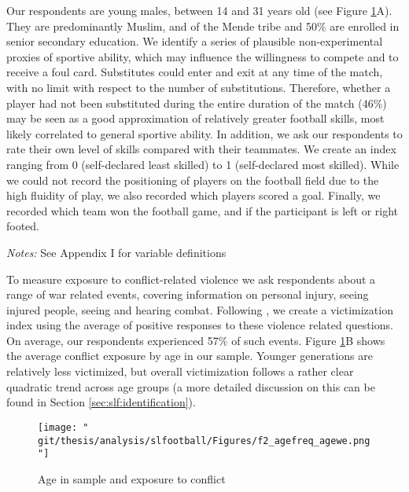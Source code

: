 Our respondents are young males, between 14 and 31 years old (see Figure \ref{fig:slf:ageconflict}A). They are predominantly Muslim, and of the Mende tribe and 50\% are enrolled in senior secondary education. We identify a series of plausible non-experimental proxies of sportive ability, which may influence the willingness to compete and to receive a foul card. Substitutes could enter and exit at any time of the match, with no limit with respect to the number of substitutions. Therefore, whether a player had not been substituted during the entire duration of the match (46\%) may be seen as a good approximation of relatively greater football skills, most likely correlated to general sportive ability. In addition, we ask our respondents to rate their own level of skills compared with their teammates. We create an index ranging from 0 (self-declared least skilled) to 1 (self-declared most skilled). While we could not record the positioning of players on the football field due to the high fluidity of play, we also recorded which players scored a goal. Finally, we recorded which team won the football game,  and if the participant is left or right footed. 

\begin{threeparttable}[htb]
	\caption{Descriptive Statistics}
	\label{tab:slf:summstats}
	\centering
	
	\begin{tablenotes}
		\item \textit{Notes:} See Appendix I for variable definitions
	\end{tablenotes}
\end{threeparttable}

To measure exposure to conflict-related violence we ask respondents about a range of war related events, covering information on personal injury, seeing injured people, seeing and hearing combat.  Following \cite{Bellows2009b}, we create a victimization index using the average of positive responses to these violence related questions. On average, our respondents experienced 57\% of such events.  Figure \ref{fig:slf:ageconflict}B shows the average conflict exposure by age in our sample. Younger generations are relatively less victimized, but overall victimization follows a rather clear quadratic trend across age groups (a more detailed discussion on this can be found in Section \ref{sec:slf:identification}).

\begin{figure}[htb]
  \texttt{[image: "\\git/thesis/analysis/slfootball/Figures/f2\_agefreq\_agewe.png"]}
  \caption{Age in sample and exposure to conflict}
  \label{fig:slf:ageconflict}
\end{figure}

